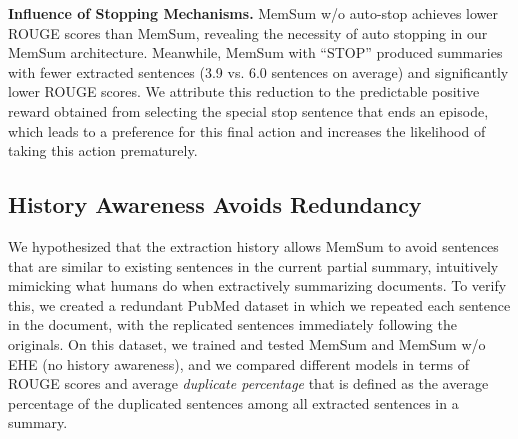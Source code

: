 \documentclass[11pt]{article}
\begin{document}
\noindent\textbf{Influence of Stopping Mechanisms.} MemSum w/o auto-stop achieves lower ROUGE scores than MemSum, revealing the necessity of auto stopping in our MemSum architecture. Meanwhile, MemSum with ``STOP'' produced summaries with fewer extracted sentences (3.9 vs. 6.0 sentences on average) and significantly lower ROUGE scores. We attribute this reduction to the predictable positive reward obtained from selecting the special stop sentence that ends an episode, which leads to a preference for this final action and increases the likelihood of taking this action prematurely.

\subsection{History Awareness Avoids Redundancy}

\begin{table}
\centering
{}
\caption{ \label{tab:res_ablation_avoid_redundancy} Performance on the redundant PubMed dataset.}  
\end{table}

We hypothesized that the extraction history allows MemSum to avoid sentences that are similar to existing sentences in the current partial summary, intuitively mimicking what humans do when extractively summarizing documents. To verify this, we created a redundant PubMed dataset in which we repeated each sentence in the document, with the replicated sentences immediately following the originals. On this dataset, we trained and tested MemSum and MemSum w/o EHE (no history awareness), and we compared different models in terms of ROUGE scores and average \textit{duplicate percentage} that is defined as the average percentage of the duplicated sentences among all extracted sentences in a summary.
\end{document}
